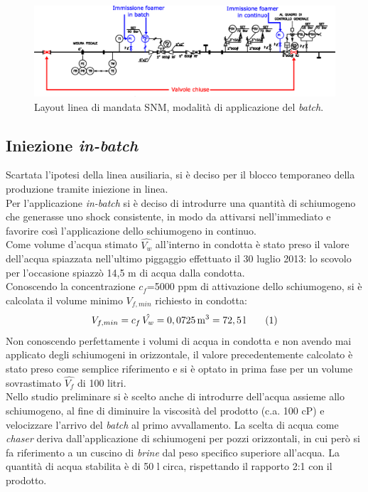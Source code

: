 \begin{figure}[htbp] %
    \centering
    \includegraphics[width=\textwidth]{fig/test/mandata.eps}
    \caption{Layout linea di mandata SNM, modalità di applicazione del \textit{batch}.} 
    \label{fig:mandata}
\end{figure}

\subsection{Iniezione \textit{in-batch}}
Scartata l'ipotesi della linea ausiliaria, si è deciso per il blocco temporaneo della produzione tramite iniezione in linea.\\
Per l'applicazione \textit{in-batch} si è deciso di introdurre una quantità di schiumogeno che generasse uno shock consistente, in modo da attivarsi nell'immediato e favorire così l'applicazione dello schiumogeno in continuo.\\
Come volume d'acqua stimato \(\hat{V_{w}}\) all'interno in condotta è stato preso il valore dell'acqua spiazzata nell'ultimo piggaggio effettuato il 30 luglio 2013: lo scovolo per l'occasione spiazzò 14,5 m di acqua dalla condotta.\\
Conoscendo la concentrazione \(c_f\)=5000 ppm di attivazione dello schiumogeno, si è calcolata il volume minimo \(V_{f,min}\) richiesto in condotta:
\[V_{f,min}= c_f\,\hat{V_w}=0,0725 \, \mathrm{m^3}=72,5 \, \mathrm{l} \label{eq:volfoamer}\addtag \]
Non conoscendo perfettamente i volumi di acqua in condotta e non avendo mai applicato degli schiumogeni in orizzontale, il valore precedentemente calcolato è stato preso come semplice riferimento e si è optato in prima fase per un volume sovrastimato \(\hat{V_{f}}\) di 100 litri.\\
Nello studio preliminare si è scelto anche di introdurre dell'acqua assieme allo schiumogeno, al fine di diminuire la viscosità del prodotto (c.a. 100 cP) e velocizzare l'arrivo del \textit{batch} al primo avvallamento. La scelta di acqua come \textit{chaser} deriva dall'applicazione di schiumogeni per pozzi orizzontali, in cui però si fa riferimento a un cuscino di \textit{brine} dal peso specifico superiore all'acqua. La quantità di acqua stabilita è di 50 l circa, rispettando il rapporto 2:1 con il prodotto.\\
